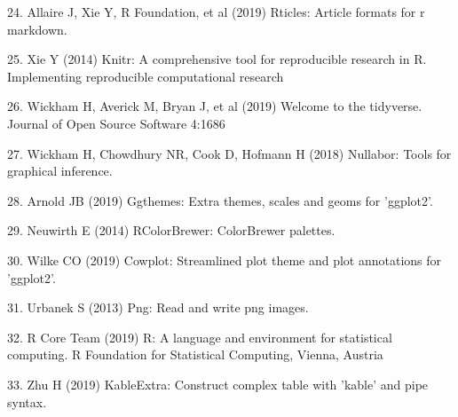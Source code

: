 \documentclass[conference,final,]{IEEEtran}
\begin{document}
\leavevmode\hypertarget{ref-rticles}{}%
24. Allaire J, Xie Y, R Foundation, et al (2019) Rticles: Article formats for r markdown.

\leavevmode\hypertarget{ref-knitr}{}%
25. Xie Y (2014) Knitr: A comprehensive tool for reproducible research in R. Implementing reproducible computational research

\leavevmode\hypertarget{ref-tidyverse}{}%
26. Wickham H, Averick M, Bryan J, et al (2019) Welcome to the tidyverse. Journal of Open Source Software 4:1686

\leavevmode\hypertarget{ref-nullabor}{}%
27. Wickham H, Chowdhury NR, Cook D, Hofmann H (2018) Nullabor: Tools for graphical inference.

\leavevmode\hypertarget{ref-ggthemes}{}%
28. Arnold JB (2019) Ggthemes: Extra themes, scales and geoms for 'ggplot2'.

\leavevmode\hypertarget{ref-RColorBrewer}{}%
29. Neuwirth E (2014) RColorBrewer: ColorBrewer palettes.

\leavevmode\hypertarget{ref-cowplot}{}%
30. Wilke CO (2019) Cowplot: Streamlined plot theme and plot annotations for 'ggplot2'.

\leavevmode\hypertarget{ref-png}{}%
31. Urbanek S (2013) Png: Read and write png images.

\leavevmode\hypertarget{ref-grid}{}%
32. R Core Team (2019) R: A language and environment for statistical computing. R Foundation for Statistical Computing, Vienna, Austria

\leavevmode\hypertarget{ref-kableExtra}{}%
33. Zhu H (2019) KableExtra: Construct complex table with 'kable' and pipe syntax.
\end{document}
